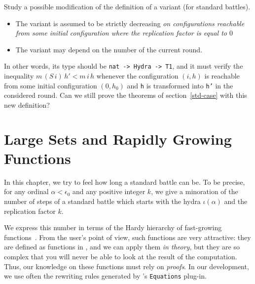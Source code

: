 \begin{project}
Study a possible modification of the definition of a variant  (for  standard battles).

\begin{itemize}
\item The variant is assumed to be strictly decreasing \emph{on configurations 
reachable from some initial configuration where the replication factor is equal to $0$}
\item The variant may depend on the number of the current round.
\end{itemize}

In other words, its type should be \texttt{nat -> Hydra -> T1}, and it must 
verify the inequality $m\, (S\,i)\, h' < m\,i\, h$ whenever the configuration 
$(i,h)$ is reachable from some initial configuration $(0,h_0)$
and \texttt{h} is transformed into \texttt{h'} in the considered round.
Can we still prove the theorems of section~\ref{std-case} with this new definition?

\end{project}



\chapter{Large Sets and Rapidly Growing Functions}\label{chap:alpha-large}



In this chapter, we try to feel how long a standard battle can be.
To be precise, for any ordinal $\alpha<\epsilon_0$ and any positive integer $k$,
we give a minoration of the number of steps of a standard battle which
starts with the hydra $\iota(\alpha)$ and the replication factor $k$.

We express this number in terms of the Hardy hierarchy of fast-growing 
functions~\cite{BW85, Wainer1970, KS81, Promel2013}.
 From the \coq{} user's point of view, such  functions are  very 
attractive:  they are defined as functions  in \gallina{}, and we can apply them \emph{in theory}, but they are so complex that you will never be able to look at the result of the computation.
 Thus, our knowledge on these functions must rely on \emph{proofs}. In our development, we use often the rewriting rules generated by \coq's \texttt{Equations} plug-in.


